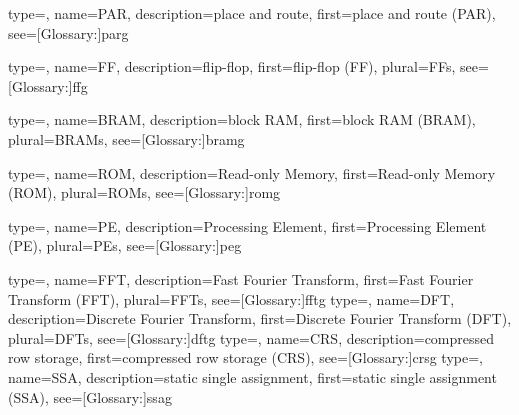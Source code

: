 {
	type=\acronymtype, 
	name={PAR}, 
	description={place and route}, 
	first={place and route (PAR)}, 
	see=[Glossary:]{parg}
}

{
	type=\acronymtype, 
	name={FF}, 
	description={flip-flop}, 
	first={flip-flop (FF)}, 
	plural={FFs},
	see=[Glossary:]{ffg}
}

{
	type=\acronymtype, 
	name={BRAM}, 
	description={block RAM}, 
	first={block RAM (BRAM)}, 
	plural={BRAMs},
	see=[Glossary:]{bramg}
}

{
	type=\acronymtype, 
	name={ROM}, 
	description={Read-only Memory}, 
	first={Read-only Memory (ROM)}, 
	plural={ROMs},
	see=[Glossary:]{romg}
}

{
	type=\acronymtype, 
	name={PE}, 
	description={Processing Element}, 
	first={Processing Element (PE)}, 
	plural={PEs},
	see=[Glossary:]{peg}
}

{
	type=\acronymtype, 
	name={FFT}, 
	description={Fast Fourier Transform}, 
	first={Fast Fourier Transform (FFT)}, 
	plural={FFTs},
	see=[Glossary:]{fftg}
}
{
	type=\acronymtype, 
	name={DFT}, 
	description={Discrete Fourier Transform}, 
	first={Discrete Fourier Transform (DFT)}, 
	plural={DFTs},
	see=[Glossary:]{dftg}
}
{
	type=\acronymtype, 
	name={CRS}, 
	description={compressed row storage}, 
	first={compressed row storage (CRS)}, 
	see=[Glossary:]{crsg}
}
{
	type=\acronymtype, 
	name={SSA}, 
	description={static single assignment}, 
	first={static single assignment (SSA)}, 
	see=[Glossary:]{ssag}
}